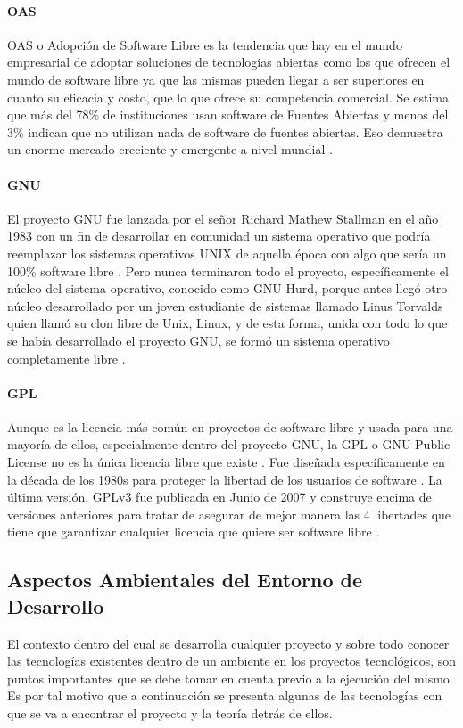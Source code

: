 \paragraph{OAS}
OAS o Adopción de Software Libre es la tendencia que hay en el mundo empresarial de adoptar soluciones de tecnologías abiertas como los que ofrecen el mundo de software libre ya que las mismas pueden llegar a ser superiores en cuanto su eficacia y costo, que lo que ofrece su competencia comercial. Se estima que más del 78\% de instituciones usan software  de Fuentes Abiertas y menos del 3\% indican que no utilizan nada de software de fuentes abiertas. Eso demuestra un enorme mercado creciente y emergente a nivel mundial \citep{ACCEL-OAS}.

\paragraph{GNU}
El proyecto GNU fue lanzada por el señor Richard Mathew Stallman en el año 1983 con un fin de desarrollar en comunidad un sistema operativo que podría reemplazar los sistemas operativos UNIX de aquella época con algo que sería un 100\% software libre \citep{GNU-GNU-OS}. Pero nunca terminaron todo el proyecto, específicamente el núcleo del sistema operativo, conocido como GNU Hurd, porque antes llegó otro núcleo desarrollado por un joven estudiante de sistemas llamado Linus Torvalds quien llamó su clon libre de Unix, Linux, y de esta forma, unida con todo lo que se había desarrollado el proyecto GNU, se formó un sistema operativo completamente libre \citep{GNU-GNU-Linux}.

\paragraph{GPL}
Aunque es la licencia más común en proyectos de software libre y usada para una mayoría de ellos, especialmente dentro del proyecto GNU, la GPL o GNU Public License no es la única licencia libre que existe \citep{GNU-Licenses}. Fue diseñada específicamente en la década de los 1980s para proteger la libertad de los usuarios de software \citep{GNU-Open-vs-Free}. La última versión, GPLv3 fue publicada en Junio de 2007 y construye encima de versiones anteriores para tratar de asegurar de mejor manera las 4 libertades que tiene que garantizar cualquier licencia que quiere ser software libre \citep{GNU-GPL-Guide} \citep{GNU-GPL}.

\subsection{Aspectos Ambientales del Entorno de Desarrollo}
El contexto dentro del cual se desarrolla cualquier proyecto y sobre todo conocer las tecnologías existentes dentro de un ambiente en los proyectos tecnológicos, son puntos importantes que se debe tomar en cuenta previo a la ejecución del mismo. Es por tal motivo que a continuación se presenta algunas de las tecnologías con que se va a encontrar el proyecto y la teoría detrás de ellos.

